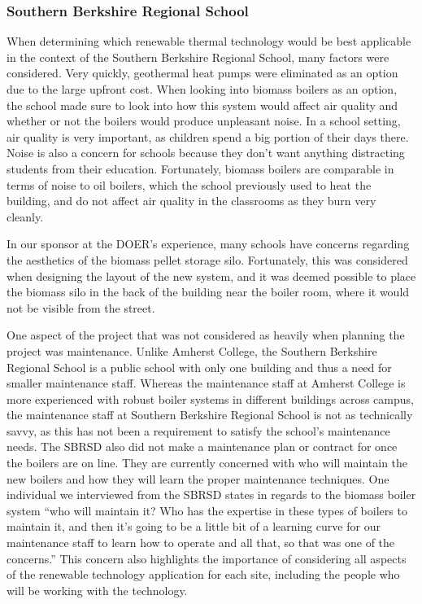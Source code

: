 \subsubsection{Southern Berkshire Regional School}
\par When determining which renewable thermal technology would be best applicable in the context of the Southern Berkshire Regional School, many factors were considered. Very quickly, geothermal heat pumps were eliminated as an option due to the large upfront cost. When looking into biomass boilers as an option, the school made sure to look into how this system would affect air quality and whether or not the boilers would produce unpleasant noise. In a school setting, air quality is very important, as children spend a big portion of their days there. Noise is also a concern for schools because they don’t want anything distracting students from their education. Fortunately, biomass boilers are comparable in terms of noise to oil boilers, which the school previously used to heat the building, and do not affect air quality in the classrooms as they burn very cleanly.
\par In our sponsor at the DOER’s experience, many schools have concerns regarding the aesthetics of the biomass pellet storage silo. Fortunately, this was considered when designing the layout of the new system, and it was deemed possible to place the biomass silo in the back of the building near the boiler room, where it would not be visible from the street.
\par One aspect of the project that was not considered as heavily when planning the project was maintenance. Unlike Amherst College, the Southern Berkshire Regional School is a public school with only one building and thus a need for smaller maintenance staff. Whereas the maintenance staff at Amherst College is more experienced with robust boiler systems in different buildings across campus, the maintenance staff at Southern Berkshire Regional School is not as technically savvy, as this has not been a requirement to satisfy the school’s maintenance needs. The SBRSD also did not make a maintenance plan or contract for once the boilers are on line. They are currently concerned with who will maintain the new boilers and how they will learn the proper maintenance techniques. One individual we interviewed from the SBRSD states in regards to the biomass boiler system “who will maintain it? Who has the expertise in these types of boilers to maintain it, and then it’s going to be a little bit of a learning curve for our maintenance staff to learn how to operate and all that, so that was one of the concerns.” This concern also highlights the importance of considering all aspects of the renewable technology application for each site, including the people who will be working with the technology.

